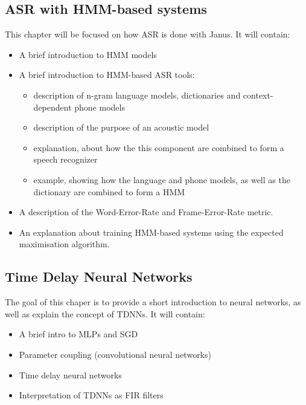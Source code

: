 \label{ch:realted_work}
\subsection{ASR with HMM-based systems}
\label{ch:HMM_ASR}

This chapter will be focused on how ASR is done with Janus. It will contain: 
\begin{itemize}
	\item A brief introduction to HMM models
	\item A brief introduction to HMM-based ASR tools:
	\begin{itemize}
		\item description of n-gram language models, dictionaries and context-dependent phone models
		\item description of the purpose of an acoustic model
		\item explanation, about how the this component are combined to form a speech recognizer 
		\item example, showing how the language and phone models, as well as the dictionary are combined to form a HMM
	\end{itemize}
	\item A description of the Word-Error-Rate and Frame-Error-Rate metric. 
	\item An explanation about training HMM-based systems using the expected maximisation algorithm. 
\end{itemize}

\subsection{Time Delay Neural Networks}
\label{ch:TDNN}
The goal of this chaper is to provide a short introduction to neural networks, 
as well as explain the concept of TDNNs. It will contain:
\begin{itemize}
	\item A brief intro to MLPs and SGD
	\item Parameter coupling (convolutional neural networks)
	\item Time delay neural networks
	\item Interpretation of TDNNs as FIR filters
\end{itemize}

